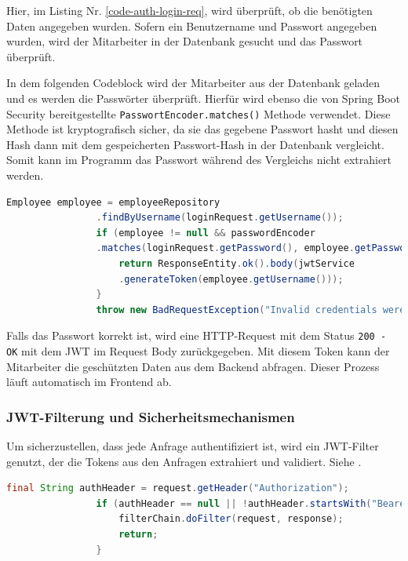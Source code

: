 			Hier, im Listing Nr. \ref{code-auth-login-req}, wird überprüft, ob die benötigten Daten angegeben wurden.
			Sofern ein Benutzername und Passwort angegeben wurden, wird der Mitarbeiter in der Datenbank gesucht und das Passwort überprüft.
			
			In dem folgenden Codeblock wird der Mitarbeiter aus der Datenbank geladen und es werden die Passwörter überprüft. Hierfür wird ebenso die von Spring Boot Security bereitgestellte \texttt{PasswortEncoder.matches()} Methode verwendet. Diese Methode ist kryptografisch sicher, da sie das gegebene Passwort hasht und diesen Hash dann mit dem gespeicherten Passwort-Hash in der Datenbank vergleicht. Somit kann im Programm das Passwort während des Vergleichs nicht extrahiert werden.
			
			\begin{lstlisting}[caption={Passwortprüfung und Token-Generierung bei erfolgreichem Login.}, label={code-auth-process-login-req}, language=Java]
				Employee employee = employeeRepository
				.findByUsername(loginRequest.getUsername());
				if (employee != null && passwordEncoder
				.matches(loginRequest.getPassword(), employee.getPassword())) {
					return ResponseEntity.ok().body(jwtService
					.generateToken(employee.getUsername()));
				}
				throw new BadRequestException("Invalid credentials were provided");
			\end{lstlisting}
			
			Falls das Passwort korrekt ist, wird eine HTTP-Request mit dem Status \texttt{200 - OK} mit dem JWT im Request Body zurückgegeben. Mit diesem Token kann der Mitarbeiter die geschützten Daten aus dem Backend abfragen. Dieser Prozess läuft automatisch im Frontend ab.
			
			\subsubsection{JWT-Filterung und Sicherheitsmechanismen}
			
			Um sicherzustellen, dass jede Anfrage authentifiziert ist, wird ein JWT-Filter genutzt, der die Tokens aus den Anfragen extrahiert und validiert. Siehe \cite{prompt-gpt-authentication-implementation}.
			
			\begin{lstlisting}[caption={Extrahierung des JWT-Tokens aus dem Authorization-Header.}, label={code-auth-jwt-service-extract-token}, language=Java]
				final String authHeader = request.getHeader("Authorization");
				if (authHeader == null || !authHeader.startsWith("Bearer ")) {
					filterChain.doFilter(request, response);
					return;
				}
			\end{lstlisting}
			
